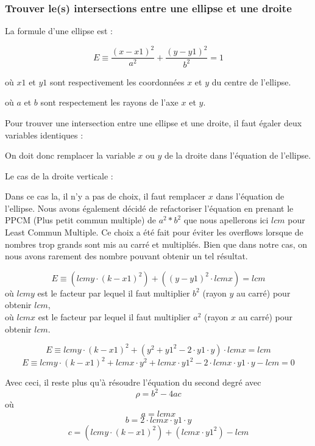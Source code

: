 \documentclass[]{article}
\begin{document}
\subsubsection{Trouver le(s) intersections entre une ellipse et une droite}

La formule d'une ellipse est : 

$$ E \equiv \frac{(x - x1)^2}{a^2} + \frac{(y - y1)^2}{b^2} = 1 $$

\begin{description}
\item où $x1$ et $y1$ sont respectivement les coordonnées
$x$ et $y$ du centre de l'ellipse. \\
\item où $a$ et $b$ sont respectement les rayons de l'axe
$x$ et $y$. \\
\end{description}

Pour trouver une intersection entre une ellipse
et une droite, il faut égaler deux variables 
identiques :


On doit donc remplacer la variable $x$ ou $y$ de la droite dans
l'équation de l'ellipse.

Le cas de la droite verticale : 

Dans ce cas la, il n'y a pas de choix, il faut remplacer
$x$ dans l'équation de l'ellipse.
Nous avons également décidé de refactoriser l'équation en 
prenant le PPCM (Plus petit commun multiple) de $a^2 * b^2$ que
nous apellerons ici $lcm$ pour Least Commun Multiple.
Ce choix a été fait pour éviter les overflows lorsque 
de nombres trop grands sont mis au carré et multipliés.
Bien que dans notre cas, on nous avons rarement des nombre
pouvant obtenir un tel résultat.

$$ E \equiv (lcmy \cdot (k - x1)^2) + ((y - y1)^2 \cdot lcmx) = lcm $$  
où $lcmy$ est le facteur par lequel il faut multiplier
$b^2$ (rayon $y$ au carré) pour obtenir $lcm$, \\
où $lcmx$ est le facteur par lequel il faut multiplier
$a^2$ (rayon $x$ au carré) pour obtenir $lcm$.

$$ E \equiv lcmy \cdot (k-x1)^2 + (y^2 + y1^2 - 2 \cdot y1 \cdot y)
\cdot lcmx = lcm$$
$$ E \equiv lcmy \cdot (k-x1)^2 + lcmx \cdot y^2 + lcmx \cdot
y1^2 - 2 \cdot lcmx \cdot y1 \cdot y - lcm = 0 $$

Avec ceci, il reste plus qu'à résoudre l'équation du second degré 
avec 
$$ \rho = b^2 - 4ac$$
où $$ a = lcmx $$
$$ b = 2 \cdot lcmx \cdot y1 \cdot y $$
$$ c = (lcmy \cdot (k-x1)^2) + (lcmx \cdot y1^2) - lcm $$
\end{document}
